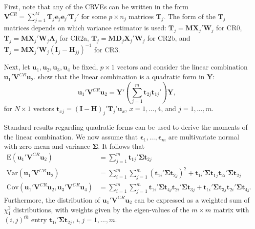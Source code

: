 \documentclass[12pt]{article}\usepackage[]{graphicx}\usepackage[]{color}
\newcommand{\E}{\text{E}}
\newcommand{\Cov}{\text{Cov}}
\newcommand{\Var}{\text{Var}}
\newcommand{\bm}{\mathbf}
\newcommand{\bs}{\boldsymbol}
\begin{document}
First, note that any of the CRVEs can be written in the form $\bm{V}^{CR} = \sum_{j=1}^M \bm{T}_j \bm{e}_j \bm{e}_j' \bm{T}_j'$ for some $p \times n_j$ matrices $\bm{T}_j$. 
The form of the $\bm{T}_j$ matrices depends on which variance estimator is used: $\bm{T}_j = \bm{M}\bm{X}_j' \bm{W}_j$ for CR0, $\bm{T}_j = \bm{M} \bm{X}_j' \bm{W}_j \bm{A}_j$ for CR2a, $\bm{T}_j = \bm{M} \bm{D}_j \bm{X}_j' \bm{W}_j$ for CR2b, and $\bm{T}_j = \bm{M} \bm{X}_j' \bm{W}_j \left(\bm{I}_j - \bm{H}_{jj}\right)^{-1}$ for CR3.

Next, let $\bm{u}_1,\bm{u}_2,\bm{u}_3,\bm{u}_4$ be fixed, $p \times 1$ vectors and consider the linear combination $\bm{u}_1' \bm{V}^{CR} \bm{u}_2$. 
\citet[Theorem 4]{Bell2002bias} show that the linear combination is a quadratic form in $\bm{Y}$: \[
\bm{u}_1' \bm{V}^{CR} \bm{u}_2 = \bm{Y}'\left(\sum_{j=1}^m \bm{t}_{2j} \bm{t}_{1j}'\right) \bm{Y}, \]
for $N \times 1$ vectors $\bm{t}_{xj} = \left(\bm{I} - \bm{H}\right)_j' \bm{T}_j' \bm{u}_x$, $x = 1,...,4$, and $j = 1,...,m$. 

Standard results regarding quadratic forms can be used to derive the moments of the linear combination. We now assume that $\bs\epsilon_1,...,\bs\epsilon_m$ are multivariate normal with zero mean and variance $\bs\Sigma$. It follows that 
\begin{align}
\label{eq:CRVE_expectation}
\E\left(\bm{u}_1' \bm{V}^{CR} \bm{u}_2\right) &= \sum_{j=1}^m \bm{t}_{1j}' \bs\Sigma \bm{t}_{2j} \\
\label{eq:CRVE_variance}
\Var\left(\bm{u}_1' \bm{V}^{CR} \bm{u}_2\right) &= \sum_{i=1}^m \sum_{j=1}^m \left(\bm{t}_{1i}' \bs\Sigma \bm{t}_{2j}\right)^2 + \bm{t}_{1i}' \bs\Sigma \bm{t}_{1j} \bm{t}_{2i}' \bs\Sigma \bm{t}_{2j} \\
\label{eq:CRVE_covariance}
\Cov\left(\bm{u}_1' \bm{V}^{CR} \bm{u}_2, \bm{u}_3' \bm{V}^{CR} \bm{u}_4\right) &= \sum_{i=1}^m \sum_{j=1}^m \bm{t}_{1i}' \bs\Sigma \bm{t}_{4j} \bm{t}_{2i}' \bs\Sigma \bm{t}_{3j} + \bm{t}_{1i}' \bs\Sigma \bm{t}_{3j} \bm{t}_{2i}' \bs\Sigma \bm{t}_{4j}.
\end{align}
Furthermore, the distribution of $\bm{u}_1' \bm{V}^{CR} \bm{u}_2$ can be expressed as a weighted sum of $\chi^2_1$ distributions, with weights given by the eigen-values of the $m \times m$ matrix with $\left(i,j\right)^{th}$ entry $\bm{t}_{1i}' \bs\Sigma \bm{t}_{2j}$, $i,j=1,...,m$.




\end{document}
